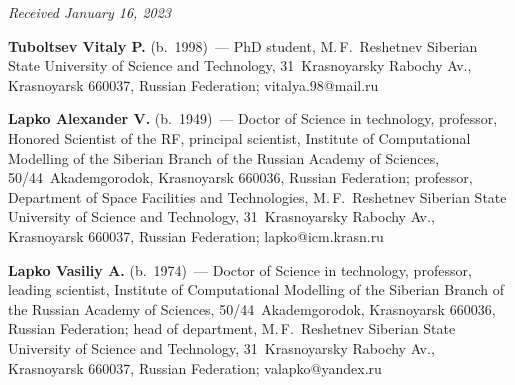 \hfill{\small\textit{Received January 16, 2023}} 


\Contr

\vspace*{-4pt}

     \noindent
     \textbf{Tuboltsev Vitaly P.} (b.\ 1998)~--- PhD student, M.\,F.~Reshetnev Siberian State University 
of Science and Technology, 31~Krasnoyarsky Rabochy Av., Krasnoyarsk 660037, Russian 
Federation; \mbox{vitalya.98@mail.ru}
     
     \vspace*{3pt}
     
     \noindent
     \textbf{Lapko Alexander V.} (b.\ 1949)~--- Doctor of Science in technology, professor, 
Honored Scientist of the RF, principal scientist, Institute of Computational Modelling 
of the Siberian Branch of the Russian Academy of Sciences, 50/44~Akademgorodok, Krasnoyarsk 
660036, Russian Federation; professor, Department of Space Facilities and Technologies, 
M.\,F.~Reshetnev Siberian State University of Science and Technology, 31~Krasnoyarsky Rabochy Av., 
Krasnoyarsk 660037, Russian Federation; \mbox{lapko@icm.krasn.ru}
     
     \noindent
     \textbf{Lapko Vasiliy A.} (b.\ 1974)~--- Doctor of Science in technology, professor, leading 
scientist, Institute of Computational Modelling of the Siberian Branch of the Russian Academy of 
Sciences, 50/44~Akademgorodok, Krasnoyarsk 660036, Russian Federation; head of 
department, M.\,F.~Reshetnev Siberian State University of Science 
and Technology, 31~Krasnoyarsky Rabochy Av., Krasnoyarsk 660037, Russian Federation; 
valapko@yandex.ru

\label{end\stat}

\renewcommand{\bibname}{\protect\rm Литература} 